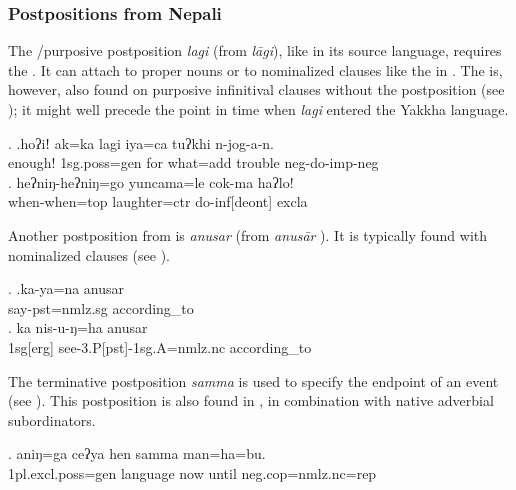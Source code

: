   
\subsubsection{Postpositions from Nepali}
  
The /purposive postposition \emph{lagi} (from   \emph{lāgi}), like in its source language, requires the  . It can attach to proper nouns  or to nominalized clauses like the  in \Next[b]. The  is, however, also found on purposive infinitival clauses without the postposition (see ); it might well precede the point in time when \emph{lagi} entered the Yakkha language.

\ex. \ag.hoʔiǃ  ak=ka          lagi  iya=ca                       tuʔkhi n-jog-a-n.\\
enough! {\sc 1sg.poss=gen} for what{\sc =add} trouble {\sc neg-}do{\sc -imp-neg}\\
 \bg.  heʔniŋ-heʔniŋ=go    yuncama=le           cok-ma       haʔlo!\\
when-when{\sc =top} laughter{\sc =ctr} do{\sc -inf[deont]} {\sc excla}\\

Another postposition from  is \emph{anusar}  (from  \emph{anusār} ). It is typically found with nominalized clauses (see \Next).


\ex. \ag.ka-ya=na                   anusar\\
say{\sc [3sg]-pst=nmlz.sg} according\_to\\
 
\bg.  ka       nis-u-ŋ=ha                                  anusar\\
{\sc 1sg[erg]} see{\sc -3.P[pst]-1sg.A=nmlz.nc} according\_to\\
 

The terminative postposition \emph{samma}   is used to specify the endpoint of an event (see \Next). This postposition is also found in , in combination with native adverbial subordinators.

\exg. aniŋ=ga            ceʔya   hen samma      man=ha=bu.\\
{\sc 1pl.excl.poss=gen}  language now until {\sc neg.cop=nmlz.nc=rep}\\
 

